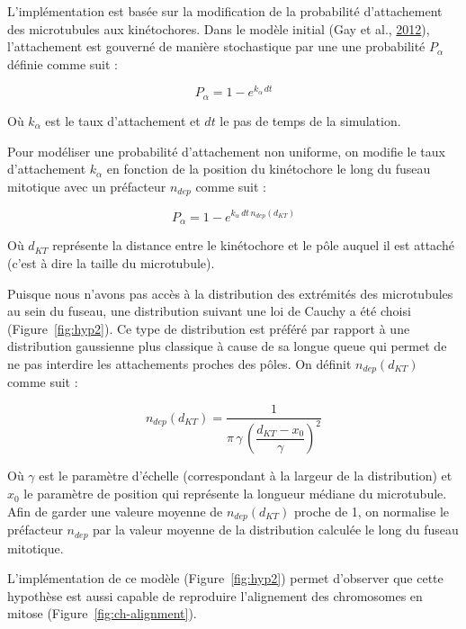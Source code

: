 \documentclass[12pt,a4paper,twoside,openright]{book}
\begin{document}
L'implémentation est basée sur la modification de la probabilité
d'attachement des microtubules aux kinétochores. Dans le modèle initial
(Gay et al., \protect\hyperlink{ref-Gay2012a}{2012}), l'attachement est
gouverné de manière stochastique par une une probabilité \(P_{\alpha}\)
définie comme suit :

\[
P_{\alpha} = 1 - e^{k_{\alpha}\,dt}
\]

Où \(k_{\alpha}\) est le taux d'attachement et \(dt\) le pas de temps de
la simulation.

Pour modéliser une probabilité d'attachement non uniforme, on modifie le
taux d'attachement \(k_{\alpha}\) en fonction de la position du
kinétochore le long du fuseau mitotique avec un préfacteur \(n_{dep}\)
comme suit :

\[
P_{\alpha} = 1 - e^{k_{\alpha}\,dt\,n_{dep}(d_{KT})}
\]

Où \(d_{KT}\) représente la distance entre le kinétochore et le pôle
auquel il est attaché (c'est à dire la taille du microtubule).

Puisque nous n'avons pas accès à la distribution des extrémités des
microtubules au sein du fuseau, une distribution suivant une loi de
Cauchy a été choisi (Figure~\ref{fig:hyp2}). Ce type de distribution est
préféré par rapport à une distribution gaussienne plus classique à cause
de sa longue queue qui permet de ne pas interdire les attachements
proches des pôles. On définit \(n_{dep}(d_{KT})\) comme suit :

\[
n_{dep}(d_{KT}) = \dfrac{1}{\pi \, \gamma \, (\dfrac{d_{KT} - x_0}{\gamma})^2}
\]

Où \(\gamma\) est le paramètre d'échelle (correspondant à la largeur de
la distribution) et \(x_0\) le paramètre de position qui représente la
longueur médiane du microtubule. Afin de garder une valeure moyenne de
\(n_{dep}(d_{KT})\) proche de 1, on normalise le préfacteur \(n_{dep}\)
par la valeur moyenne de la distribution calculée le long du fuseau
mitotique.

L'implémentation de ce modèle (Figure~\ref{fig:hyp2}) permet d'observer
que cette hypothèse est aussi capable de reproduire l'alignement des
chromosomes en mitose (Figure~\ref{fig:ch-alignment}).
\end{document}
